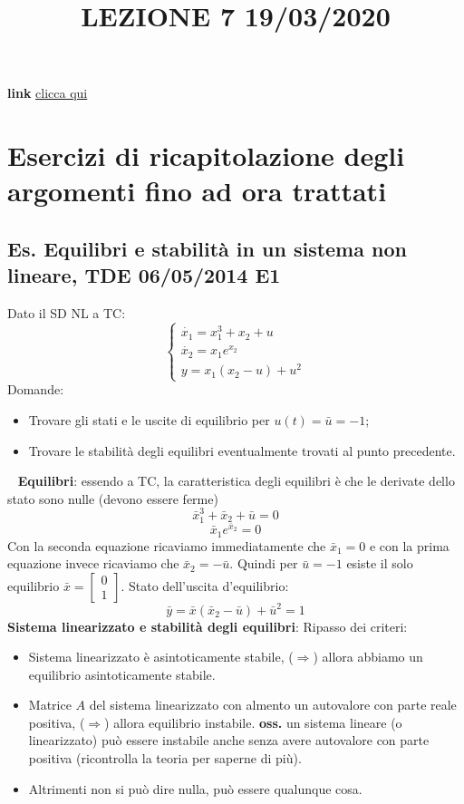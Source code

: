 \newpage
\title{LEZIONE 7 19/03/2020}\newline
\textbf{link} \href{https://web.microsoftstream.com/video/2feefb06-11cb-4de4-ac19-dcc5fe175a98?list=user&userId=faa91214-a6f5-40d7-8875-253fd49b8ce1}{clicca qui}
\section{Esercizi di ricapitolazione degli argomenti fino ad ora trattati}
\subsection{Es. Equilibri e stabilità in un sistema non lineare, TDE 06/05/2014 E1} Dato il SD NL a TC:
\[
    \begin{cases}
        \dot{x_1} = x_1^3 + x_2 + u\\
        \dot{x_2} = x_1 e^{x_2}\\
        y = x_1 (x_2 - u) + u^2
    \end{cases}
\]
Domande:
\begin{itemize}
    \item Trovare gli stati e le uscite di equilibrio per $u(t) = \bar{u} = -1$;
    \item Trovare le stabilità degli equilibri eventualmente trovati al punto precedente.
\end{itemize}
\ \newline
\textbf{Equilibri}:\newline
essendo a TC, la caratteristica degli equilibri è che le derivate dello stato sono nulle (devono essere ferme)
\[
    \bar{x}_1^3 + \bar{x}_2 + \bar{u} = 0
\]
\[
    \bar{x}_1 e^{\bar{x}_2} = 0
\]
Con la seconda equazione ricaviamo immediatamente che $\bar{x}_1 = 0$ e con la prima equazione invece ricaviamo che $\bar{x}_2 = - \bar{u}$.\newline
Quindi per $\bar{u} = -1$ esiste il solo equilibrio 
$\bar{x} = \left[\begin{matrix}
    0 \\ 
    1
\end{matrix}\right]$.\newline
Stato dell'uscita d'equilibrio:
\[
    \bar{y} = \bar{x} (\bar{x}_2 - \bar{u}) + \bar{u}^2 = 1
\]
\newline
\textbf{Sistema linearizzato e stabilità degli equilibri}:\newline
Ripasso dei criteri:
\begin{itemize}
    \item Sistema linearizzato è asintoticamente stabile, ($\Rightarrow$) allora abbiamo un equilibrio asintoticamente stabile.
    \item Matrice $A$ del sistema linearizzato con almento un autovalore con parte reale positiva, ($\Rightarrow $) allora equilibrio instabile.\newline
    \textbf{oss.} un sistema lineare (o linearizzato) può essere instabile anche senza avere autovalore con parte positiva (ricontrolla la teoria per saperne di più).
    \item Altrimenti non si può dire nulla, può essere qualunque cosa.
\end{itemize}
